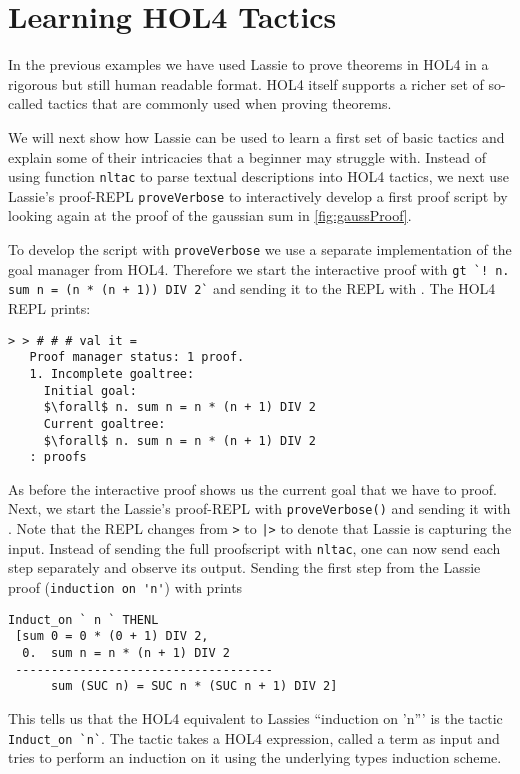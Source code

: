 \section{Learning HOL4 Tactics}

In the previous examples we have used Lassie to prove theorems in HOL4 in a
rigorous but still human readable format.
HOL4 itself supports a richer set of so-called tactics that are commonly used
when proving theorems.

We will next show how Lassie can be used to learn a first set of basic tactics
and explain some of their intricacies that a beginner may struggle with.
Instead of using function \lstinline{nltac} to parse textual descriptions into HOL4
tactics, we next use Lassie's proof-REPL \lstinline{proveVerbose} to interactively
develop a first proof script by looking again at the proof of the gaussian sum
in \autoref{fig:gaussProof}.

To develop the script with \lstinline{proveVerbose} we use a separate
implementation of the goal manager from HOL4.
Therefore we start the interactive proof with \lstinline{gt `! n. sum n = (n * (n + 1)) DIV 2`}
and sending it to the REPL with .
The HOL4 REPL prints:
\begin{lstlisting}[frame=single, mathescape=true]
> > # # # val it =
   Proof manager status: 1 proof.
   1. Incomplete goaltree:
     Initial goal:
     $\forall$ n. sum n = n * (n + 1) DIV 2
     Current goaltree:
     $\forall$ n. sum n = n * (n + 1) DIV 2
   : proofs
\end{lstlisting}

As before the interactive proof shows us the current goal that we have to proof.
Next, we start the Lassie's proof-REPL with \lstinline{proveVerbose()} and
sending it with .
Note that the REPL changes from \lstinline{>} to \lstinline{|>} to denote that
Lassie is capturing the input.
Instead of sending the full proofscript with \lstinline{nltac}, one can now send
each step separately and observe its output.
Sending the first step from the Lassie proof (\lstinline{induction on 'n'}) with
 prints
%
\begin{lstlisting}[frame=single]
Induct_on ` n ` THENL
 [sum 0 = 0 * (0 + 1) DIV 2,
  0.  sum n = n * (n + 1) DIV 2
 ------------------------------------
      sum (SUC n) = SUC n * (SUC n + 1) DIV 2]
\end{lstlisting}

This tells us that the HOL4 equivalent to Lassies ``induction on 'n''' is the
tactic \lstinline{Induct_on `n`}.
The tactic takes a HOL4 expression, called a term as input and tries to perform
an induction on it using the underlying types induction scheme.

